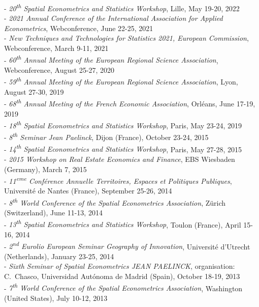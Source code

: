 \documentclass[a4paper,12pt]{article}
\begin{document}
\noindent - \textit{20\textsuperscript{th} Spatial Econometrics and Statistics Workshop}, Lille, May 19-20, 2022\\  
- \textit{2021 Annual Conference of the International Association for Applied Econometrics}, Webconference, June 22-25, 2021 \\
- \textit{New Techniques and Technologies for Statistics 2021, European Commission}, Webconference, March 9-11, 2021 \\
- \textit{60\textsuperscript{th} Annual Meeting of the European Regional Science Association}, Webconference, August 25-27, 2020 \\
- \textit{59\textsuperscript{th} Annual Meeting of the European Regional Science Association}, Lyon, August 27-30, 2019 \\
- \textit{68\textsuperscript{th} Annual Meeting of the French Economic Association}, Orléans, June 17-19, 2019 \\
- \textit{18\textsuperscript{th} Spatial Econometrics and Statistics Workshop}, Paris, May 23-24, 2019 \\
- \textit{8\textsuperscript{th} Seminar Jean Paelinck}, Dijon (France), October 23-24, 2015 \\
- \textit{14\textsuperscript{th} Spatial Econometrics and Statistics Workshop}, Paris, May 27-28, 2015 \\
- \textit{2015 Workshop on Real Estate Economics and Finance}, EBS Wiesbaden (Germany), March 7, 2015 \\
- \textit{11\textsuperscript{eme} Conférence Annuelle Territoires, Espaces et Politiques Publiques}, Université de Nantes (France), September 25-26, 2014 \\
- \textit{8\textsuperscript{th} World Conference of the Spatial Econometrics Association}, Zürich (Switzerland), June 11-13, 2014 \\
- \textit{13\textsuperscript{th} Spatial Econometrics and Statistics Workshop}, Toulon (France), April 15-16, 2014 \\
- \textit{2\textsuperscript{nd} Eurolio European Seminar Geography of Innovation}, Université d'Utrecht (Netherlands), January 23-25, 2014 \\
- \textit {Sixth Seminar of Spatial Econometrics JEAN PAELINCK}, organisation: C.~Chasco, Universidad Autónoma de Madrid (Spain), October 18-19, 2013 \\
- \textit{7\textsuperscript{th} World Conference of the Spatial Econometrics Association}, Washington (United States), July 10-12, 2013 \\
\end{document}
